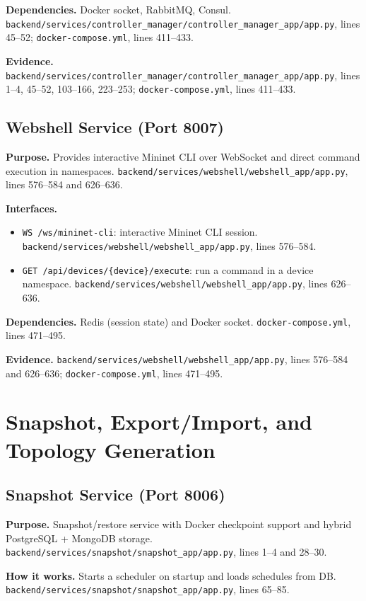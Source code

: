 \documentclass[conference]{IEEEtran}
\begin{document}
\textbf{Dependencies.} Docker socket, RabbitMQ, Consul. \texttt{backend/services/controller\_manager/controller\_manager\_app/app.py}, lines 45--52; \texttt{docker-compose.yml}, lines 411--433.

\textbf{Evidence.} \texttt{backend/services/controller\_manager/controller\_manager\_app/app.py}, lines 1--4, 45--52, 103--166, 223--253; \texttt{docker-compose.yml}, lines 411--433.

\subsection{Webshell Service (Port 8007)}
\textbf{Purpose.} Provides interactive Mininet CLI over WebSocket and direct command execution in namespaces. \texttt{backend/services/webshell/webshell\_app/app.py}, lines 576--584 and 626--636.

\textbf{Interfaces.}
\begin{itemize}
\item \texttt{WS /ws/mininet-cli}: interactive Mininet CLI session. \texttt{backend/services/webshell/webshell\_app/app.py}, lines 576--584.
\item \texttt{GET /api/devices/\{device\}/execute}: run a command in a device namespace. \texttt{backend/services/webshell/webshell\_app/app.py}, lines 626--636.
\end{itemize}

\textbf{Dependencies.} Redis (session state) and Docker socket. \texttt{docker-compose.yml}, lines 471--495.

\textbf{Evidence.} \texttt{backend/services/webshell/webshell\_app/app.py}, lines 576--584 and 626--636; \texttt{docker-compose.yml}, lines 471--495.

\section{Snapshot, Export/Import, and Topology Generation}

\subsection{Snapshot Service (Port 8006)}
\textbf{Purpose.} Snapshot/restore service with Docker checkpoint support and hybrid PostgreSQL + MongoDB storage. \texttt{backend/services/snapshot/snapshot\_app/app.py}, lines 1--4 and 28--30.

\textbf{How it works.} Starts a scheduler on startup and loads schedules from DB. \texttt{backend/services/snapshot/snapshot\_app/app.py}, lines 65--85.
\end{document}
